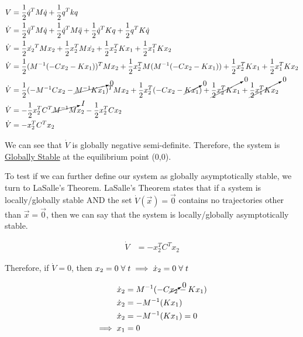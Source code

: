 \documentclass{article}
\begin{document}
  \begin{align*}
    V &= \frac{1}{2}\dot{q}^TM\dot{q} + \frac{1}{2}q^Tkq \\
    \dot{V} &= \frac{1}{2}\ddot{q}^TM\dot{q} + \frac{1}{2}\dot{q}^TM\ddot{q} + \frac{1}{2}\dot{q}^TKq + \frac{1}{2}q^TK\dot{q} \\
    \dot{V} &= \frac{1}{2}\dot{x_2}^TMx_2 + \frac{1}{2}x_2^TM\dot{x_2} + \frac{1}{2}x_2^TKx_1 + \frac{1}{2}x_1^TKx_2 \\
    \dot{V} &= \frac{1}{2}(M^{-1}(-Cx_2-Kx_1))^TMx_2 + \frac{1}{2}x_2^TM(M^{-1}(-Cx_2-Kx_1)) + \frac{1}{2}x_2^TKx_1 + \frac{1}{2}x_1^TKx_2 \\
    \dot{V} &= \frac{1}{2}(-M^{-1}Cx_2 - \cancelto{0}{M^{-1}Kx_1})^TMx_2 + \frac{1}{2}x_2^T(-Cx_2-\cancelto{0}{Kx_1}) + \cancelto{0}{\frac{1}{2}x_2^TKx_1} + \cancelto{0}{\frac{1}{2}x_1^TKx_2} \\
    \dot{V} &= -\frac{1}{2}x_2^TC^T\cancelto{I}{M^{-1}M}x_2 - \frac{1}{2}x_2^TCx_2 \\
    \dot{V} &= -x_2^TC^Tx_2
  \end{align*}

  We can see that $\dot{V}$ is globally negative semi-definite. Therefore, the system is
  \underline{Globally Stable} at the equilibrium point (0,0). \newline \newline

  To test if we can further define our system as globally asymptotically stable,
  we turn to LaSalle's Theorem. LaSalle's Theorem states that if a system is
  locally/globally stable AND the set $\dot{V}(\vec{x})=\vec{0}$ contains no
  trajectories other than $\vec{x}=\vec{0}$, then we can say that the system is
  locally/globally asymptotically stable.

  \begin{align*}
    \dot{V} &= -x_2^TC^Tx_2
  \end{align*}

  Therefore, if $\dot{V}=0$, then $x_2=0 \hspace{1mm} \forall \hspace{1mm} t
  \implies \dot{x}_2=0 \hspace{1mm} \forall \hspace{1mm} t$

  \begin{align*}
    \dot{x}_2 &= M^{-1}(-C\cancelto{0}{x_2}-Kx_1) \\
    \dot{x}_2 &= -M^{-1}(Kx_1) \\
    \dot{x}_2 &= -M^{-1}(Kx_1) = 0 \\
    \implies x_1 &= 0
  \end{align*}
\end{document}
